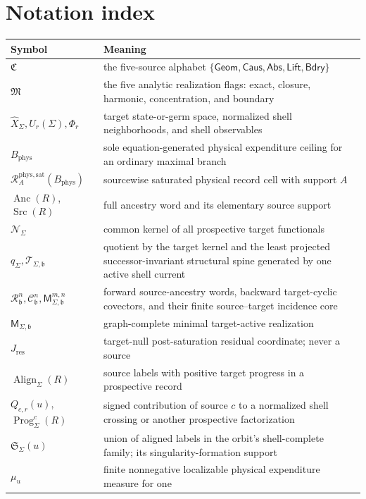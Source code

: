 \documentclass[11pt]{article}
\numberwithin{section}{part}
\theoremstyle{plain}
\theoremstyle{definition}
\theoremstyle{remark}
\newcommand{\Geom}{\mathsf{Geom}}
\newcommand{\Caus}{\mathsf{Caus}}
\newcommand{\Abs}{\mathsf{Abs}}
\newcommand{\Lift}{\mathsf{Lift}}
\newcommand{\Bdry}{\mathsf{Bdry}}
\newcommand{\Res}{J_{\mathrm{res}}}
\newcommand{\Channels}{\mathfrak C}
\newcommand{\Modes}{\mathfrak M}
\newcommand{\Anc}{\operatorname{Anc}}
\newcommand{\Src}{\operatorname{Src}}
\newcommand{\Align}{\operatorname{Align}}
\newcommand{\Null}{\mathscr N}
\newcommand{\Records}{\mathscr R}
\newcommand{\Spine}{\mathscr T}
\newcommand{\Phys}{\mathrm{phys}}
\newcommand{\Sat}{\mathrm{sat}}
\newcommand{\Budget}{B_{\Phys}}
\begin{document}
\section{Notation index}
\label{app:notation}

\begin{longtable}{p{.22\linewidth}p{.68\linewidth}}
\toprule
Symbol & Meaning\\
\midrule
\(\Channels\) & the five-source alphabet
\(\{\Geom,\Caus,\Abs,\Lift,\Bdry\}\)\\
\(\Modes\) & the five analytic realization flags: exact, closure, harmonic,
concentration, and boundary\\
\(\widehat X_\Sigma,U_r(\Sigma),\Phi_r\) & target state-or-germ space,
normalized shell neighborhoods, and shell observables\\
\(\Budget\) & sole equation-generated physical expenditure ceiling for an
ordinary maximal branch\\
\(\Records_A^{\Phys,\Sat}(\Budget)\) & sourcewise saturated physical record
cell with support \(A\)\\
\(\Anc(R)\), \(\Src(R)\) & full ancestry word and its elementary source
support\\
\(\Null_\Sigma\) & common kernel of all prospective target functionals\\
\(q_\Sigma,\Spine_{\Sigma,\mathfrak b}\) & quotient by the target kernel and
the least projected successor-invariant structural spine generated by one
active shell current\\
\(\mathscr R^n_{\mathfrak b},\mathscr C^n_{\mathfrak b},
\mathsf M^{m,n}_{\Sigma,\mathfrak b}\) & forward source-ancestry words,
backward target-cyclic covectors, and their finite source--target incidence
core\\
\(\mathsf M_{\Sigma,\mathfrak b}\) & graph-complete minimal target-active
realization\\
\(\Res\) & target-null post-saturation residual coordinate; never a source\\
\(\Align_\Sigma(R)\) & source labels with positive target progress in a
prospective record\\
\(Q_{c,r}(u)\), \(\operatorname{Prog}_\Sigma^c(R)\) & signed contribution of
source \(c\) to a normalized shell crossing or another prospective
factorization\\
\(\mathfrak S_\Sigma(u)\) & union of aligned labels in the orbit's
shell-complete family; its singularity-formation support\\
\(\mu_u\) & finite nonnegative localizable physical expenditure measure for one

\end{longtable}
\end{document}
